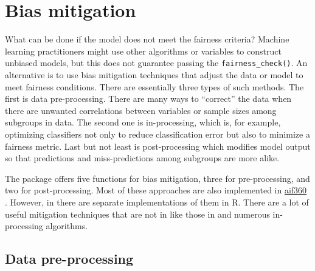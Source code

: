 \hypertarget{mitigation}{%
\section{Bias mitigation}\label{mitigation}}

What can be done if the model does not meet the fairness criteria?
Machine learning practitioners might use other algorithms or variables
to construct unbiased models, but this does not guarantee passing the
\texttt{fairness\_check()}. An alternative is to use bias mitigation
techniques that adjust the data or model to meet fairness conditions.
There are essentially three types of such methods. The first is data
pre-processing. There are many ways to ``correct'' the data when there
are unwanted correlations between variables or sample sizes among
subgroups in data. The second one is in-processing, which is, for
example, optimizing classifiers not only to reduce classification error
but also to minimize a fairness metric. Last but not least is
post-processing which modifies model output so that predictions and
miss-predictions among subgroups are more alike.

The  package offers five functions for bias mitigation,
three for pre-processing, and two for post-processing. Most of these
approaches are also implemented in
\href{https://aif360.mybluemix.net/}{aif360} \citep{aif360-oct-2018}.
However, in  there are separate implementations of them
in R. There are a lot of useful mitigation techniques that are not in
 like those in \citet{NIPS20166374} and numerous
in-processing algorithms.

\hypertarget{data-pre-processing}{%
\subsection{Data pre-processing}\label{data-pre-processing}}

